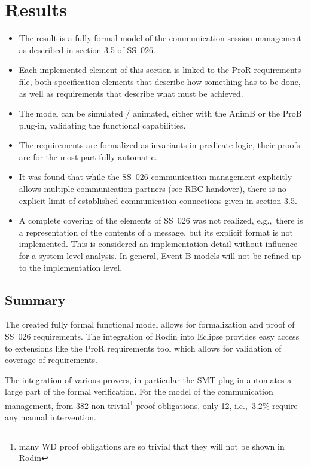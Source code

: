 \documentclass{article}
\newcommand{\nl}{\mbox{}\\}
\newcommand{\bgcmmnt}[1]{\nl\framebox{\parbox{.95\textwidth}{#1}}\nl[2mm]}
\begin{document}


\section{Results}
\label{sec:results}

\begin{itemize}
\item The result is a fully formal model of the communication session management
  as described in section 3.5 of SS~026.
\item Each implemented element of this section is linked to the ProR
  requirements file, both specification elements that describe how something has
  to be done, as well as requirements that describe what must be achieved.
\item The model can be simulated / animated, either with the AnimB or the ProB
  plug-in, validating the functional capabilities.
\item The requirements are formalized as invariants in predicate logic, their
  proofs are for the most part fully automatic.
\item It was found that while the SS~026 communication management explicitly
  allows multiple communication partners (see RBC handover), there is no
  explicit limit of established communication connections given in section 3.5.
\item A complete covering of the elements of SS~026 was not realized, e.g.,\
  there is a representation of the contents of a message, but its explicit
  format is not implemented. This is considered an implementation detail without
  influence for a system level analysis. In general, Event-B models will not be
  refined up to the implementation level.
\end{itemize}

\subsection{Summary}

The created fully formal functional model allows for formalization and proof of
SS~026 requirements. The integration of Rodin into Eclipse provides easy access
to extensions like the ProR requirements tool which allows for validation of
coverage of requirements.

The integration of various provers, in particular the SMT plug-in automates a
large part of the formal verification. For the model of the communication
management, from 382 non-trivial\footnote{many WD proof obligations are so
  trivial that they will not be shown in Rodin} proof obligations, only 12,
i.e.,\ $3.2\%$ require any manual intervention.
\end{document}
